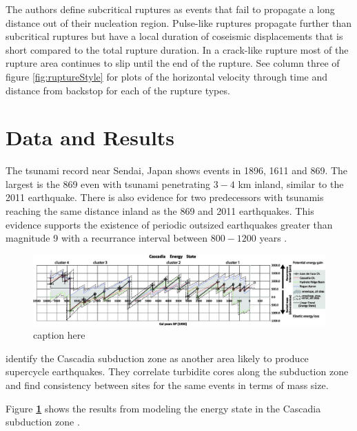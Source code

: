 \documentclass[draft,jgrga]{agutex}
\begin{document}
 The authors define subcritical ruptures as events that fail to propagate a long distance out of their nucleation region. Pulse-like ruptures propagate further than subcritical ruptures but have a local duration of coseismic displacements that is short compared to the total rupture duration. In a crack-like rupture most of the rupture area continues to slip until the end of the rupture. See column three of figure \ref{fig:ruptureStyle} for plots of the horizontal velocity through time and distance from backstop for each of the rupture types.


\section{Data and Results}
The tsunami record near Sendai, Japan shows events in 1896, 1611 and 869. The largest is the 869 even with tsunami penetrating $3-4$ km inland, similar to the 2011 earthquake. There is also evidence for two predecessors with tsunamis reaching the same distance inland as the 869 and 2011 earthquakes. This evidence supports the existence of periodic outsized earthquakes greater than magnitude 9 with a recurrance interval between $800 -1200$ years \citep{Goldfinger2013}.

\begin{figure}
	\includegraphics[width=1\linewidth]{./Figures/Goldfinger/F4large.jpg}
	\caption{caption here}
	\label{fig:energyCycle}
\end{figure}


\citet{Goldfinger2013} identify the Cascadia subduction zone as another area likely to produce supercycle earthquakes. They correlate turbidite cores along the subduction zone and find consistency between sites for the same events in terms of mass size. 

Figure {\bf \ref{fig:energyCycle}} shows the results from modeling the energy state in the Cascadia subduction zone \citep{Goldfinger2013}. 
\end{document}
